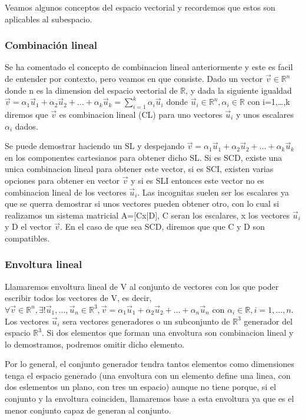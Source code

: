 \documentclass[11pt,a4paper]{article}
\begin{document}
Veamos algunos conceptos del espacio vectorial y recordemos que estos son aplicables al subespacio.

\subsubsection{Combinación lineal}

Se ha comentado el concepto de combinacion lineal anteriormente y este es facil de entender por contexto, pero veamos en que consiste. Dado un vector $\vec{v} \in \mathbb{R}^n$ donde n es la dimension del espacio vectorial de $\mathbb{R}$, y dada la siguiente igualdad $\vec{v}=\alpha_1\vec{u}_1+\alpha_2\vec{u}_2+\dots+\alpha_k\vec{u}_k=\sum_{i=1}^k\alpha_i\vec{u}_i$ donde $\vec{u}_i\in \mathbb{R}^n,\alpha_i\in \mathbb{R}$ con i=1,\dots ,k diremos que $\vec{v}$ es combinacion lineal (CL) para uno vectores $\vec{u}_i$ y unos escalares $\alpha_i$ dados.

 Se puede demostrar haciendo un SL y despejando  $\vec{v}=\alpha_1\vec{u}_1+\alpha_2\vec{u}_2+\dots+\alpha_k\vec{u}_k$ en los componentes cartesianos para obtener dicho SL. Si es SCD, existe una unica combinacion lineal para obtener este vector, si es SCI, existen varias opciones para obtener en vector $\vec{v}$ y si es SLI entonces este vector no es combinacion lineal de los vectores $\vec{u}_i$. Las incognitas suelen ser los escalares ya que se querra demostrar si unos vectores pueden obtener otro, con lo cual si realizamos un sistema matricial A=[Cx|D], C seran los escalares, x los vectores $\vec{u}_i$ y D el vector $\vec{v}$. En el caso de que sea SCD, diremos que que C y D son compatibles.

\subsubsection{Envoltura lineal}

Llamaremos envoltura lineal de V al conjunto de vectores con los que poder escribir todos los vectores de V, es decir, $\forall \vec{v}\in \mathbb{R}^n, \exists ! \vec{u}_1,\dots ,\vec{u}_n\in \mathbb{R}^3, \vec{v}=\alpha_1\vec{u}_1+\alpha_2\vec{u}_2+\dots+\alpha_n\vec{u}_n\text{ con }\alpha_i\in \mathbb{R}, i=1,\dots ,n$. Los vectores $\vec{u}_i$ sera vectores generadores o un subconjunto de $\mathbb{R}^3$ generador del espacio $\mathbb{R}^3$. Si dos elementos que forman una envoltura son combinacion lineal y lo demostramos, podremos omitir dicho elemento.

 Por lo general, el conjunto generador tendra tantos elementos como dimensiones tenga el espacio generado (una envoltura con un elemento define una linea, con dos eslementos un plano, con tres un espacio) aunque no tiene porque, si el conjunto y la envoltura coinciden, llamaremos base a esta envoltura ya que es el menor conjunto capaz de generan al conjunto.
 
\end{document}
